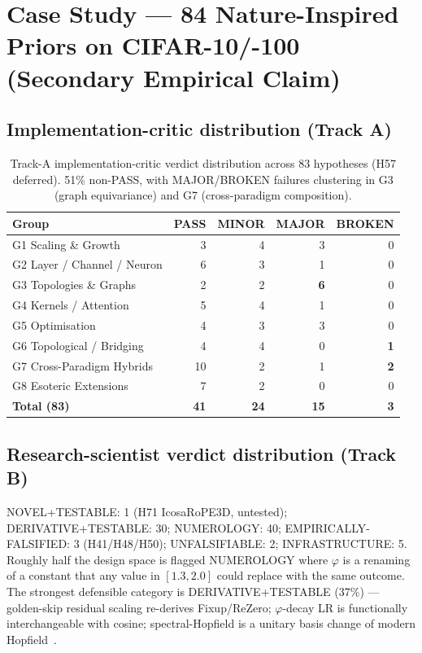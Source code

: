 \documentclass{article}
\begin{document}
\section{Case Study --- 84 Nature-Inspired Priors on CIFAR-10/-100 (Secondary Empirical Claim)}
\label{sec:empirical}

\subsection{Implementation-critic distribution (Track A)}
\label{sec:track-a-dist}

\begin{table}[t]
\small\centering
\caption{Track-A implementation-critic verdict distribution across 83
hypotheses (H57 deferred). 51\% non-PASS, with MAJOR/BROKEN failures
clustering in G3 (graph equivariance) and G7 (cross-paradigm
composition).}
\label{tab:track-a}
\begin{tabular}{l rrrr}
\toprule
Group & PASS & MINOR & MAJOR & BROKEN \\
\midrule
G1 Scaling \& Growth      & 3 & 4 & 3 & 0 \\
G2 Layer / Channel / Neuron & 6 & 3 & 1 & 0 \\
G3 Topologies \& Graphs    & 2 & 2 & \textbf{6} & 0 \\
G4 Kernels / Attention     & 5 & 4 & 1 & 0 \\
G5 Optimisation            & 4 & 3 & 3 & 0 \\
G6 Topological / Bridging  & 4 & 4 & 0 & \textbf{1} \\
G7 Cross-Paradigm Hybrids  & 10 & 2 & 1 & \textbf{2} \\
G8 Esoteric Extensions     & 7 & 2 & 0 & 0 \\
\midrule
\textbf{Total (83)}        & \textbf{41} & \textbf{24} & \textbf{15} & \textbf{3} \\
\bottomrule
\end{tabular}
\end{table}

\subsection{Research-scientist verdict distribution (Track B)}
\label{sec:track-b-dist}

NOVEL+TESTABLE: 1 (H71 IcosaRoPE3D, untested); DERIVATIVE+TESTABLE:
30; NUMEROLOGY: 40; EMPIRICALLY-FALSIFIED: 3
(H41/H48/H50); UNFALSIFIABLE: 2; INFRASTRUCTURE: 5. Roughly half the
design space is flagged NUMEROLOGY where $\varphi$ is a renaming of a
constant that any value in $[1.3, 2.0]$ could replace with the same
outcome. The strongest defensible category is DERIVATIVE+TESTABLE
(37\%) --- golden-skip residual scaling re-derives
Fixup/ReZero; $\varphi$-decay LR is functionally interchangeable with
cosine; spectral-Hopfield is a unitary basis change of modern
Hopfield~\citep{ramsauer2021hopfield}.
\end{document}

